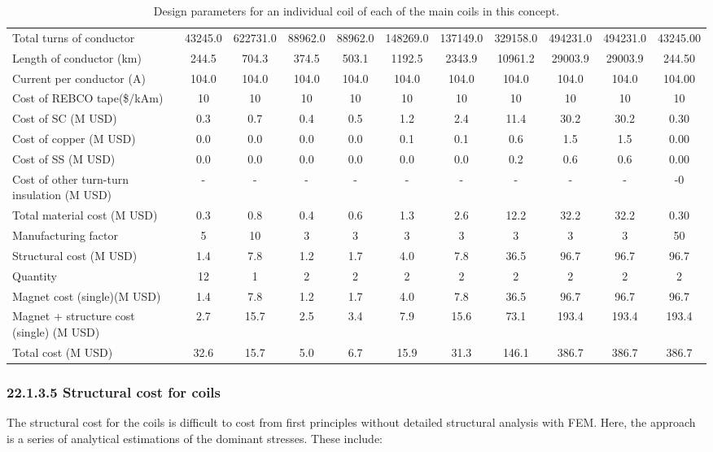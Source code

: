 \begin{table}[h]
{\begin{tabular}{lcccccccccc}
Total turns of conductor & 43245.0 & 622731.0 & 88962.0 & 88962.0 & 148269.0 & 137149.0 & 329158.0 & 494231.0 & 494231.0 & 43245.00 \\
Length of conductor (km) & 244.5 & 704.3 & 374.5 & 503.1 & 1192.5 & 2343.9 & 10961.2 & 29003.9 & 29003.9 & 244.50 \\
Current per conductor (A) & 104.0 & 104.0 & 104.0 & 104.0 & 104.0 & 104.0 & 104.0 & 104.0 & 104.0 & 104.00 \\
\hline
Cost of REBCO tape(\$/kAm) & 10 & 10 & 10 & 10 & 10 & 10 & 10 & 10 & 10 & 10 \\
Cost of SC (M USD) & 0.3 & 0.7 & 0.4 & 0.5 & 1.2 & 2.4 & 11.4 & 30.2 & 30.2 & 0.30 \\
Cost of copper (M USD) & 0.0 & 0.0 & 0.0 & 0.0 & 0.1 & 0.1 & 0.6 & 1.5 & 1.5 & 0.00 \\
Cost of SS (M USD) & 0.0 & 0.0 & 0.0 & 0.0 & 0.0 & 0.0 & 0.2 & 0.6 & 0.6 & 0.00 \\
Cost of other turn-turn insulation (M USD) & - & - & - & - & - & - & - & - & - & -0 \\
Total material cost (M USD) & 0.3 & 0.8 & 0.4 & 0.6 & 1.3 & 2.6 & 12.2 & 32.2 & 32.2 & 0.30 \\
Manufacturing factor & 5 & 10 & 3 & 3 & 3 & 3 & 3 & 3 & 3 & 50 \\
Structural cost (M USD) & 1.4 & 7.8 & 1.2 & 1.7 & 4.0 & 7.8 & 36.5 & 96.7 & 96.7 & 96.7 \\
Quantity & 12 & 1 & 2 & 2 & 2 & 2 & 2 & 2 & 2 & 2 \\
Magnet cost (single)(M USD) & 1.4 & 7.8 & 1.2 & 1.7 & 4.0 & 7.8 & 36.5 & 96.7 & 96.7 & 96.7 \\
Magnet + structure cost (single) (M USD) & 2.7 & 15.7 & 2.5 & 3.4 & 7.9 & 15.6 & 73.1 & 193.4 & 193.4 & 193.4 \\
\hline
Total cost (M USD) & 32.6 & 15.7 & 5.0 & 6.7 & 15.9 & 31.3 & 146.1 & 386.7 & 386.7 & 386.7 \\
\hline
\end{tabular}}
\caption{Design parameters for an individual coil of each of the main coils in this concept.}
\label{your-table-label}
\end{table}


\subsubsection*{22.1.3.5 Structural cost for coils}

The structural cost for the coils is difficult to cost from first principles without detailed structural analysis with FEM. Here, the approach is a series of analytical estimations of the dominant stresses. These include:


